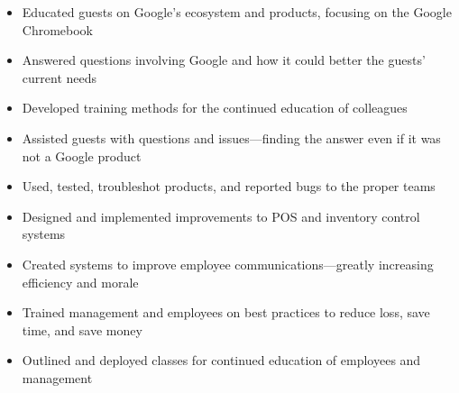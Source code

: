 \documentclass[letterpaper]{article}        %
\begin{document}


  \begin{itemize}
  
  \item Educated guests on Google's ecosystem and products, focusing on the Google Chromebook
  
  \item Answered questions involving Google and how it could better the guests' current needs
  
  \item Developed training methods for the continued education of colleagues
  
  \item Assisted guests with questions and issues---finding the answer even if it was not a Google product
  
  \item Used, tested, troubleshot products, and reported bugs to the proper teams
  
  \end{itemize}
  
  \begin{itemize}
  
  \item Designed and implemented improvements to POS and inventory control systems
  
  \item Created systems to improve employee communications---greatly increasing efficiency and morale
  
  \item Trained management and employees on best practices to reduce loss, save time, and save money
  
  \item Outlined and deployed classes for continued education of employees and management
  
  \end{itemize}
  
\end{document}
